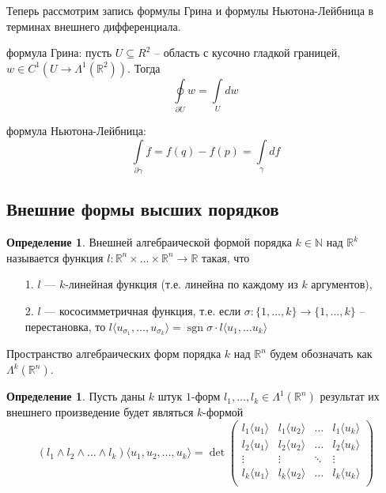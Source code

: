 \documentclass[a5paper]{article}
\newcounter{through}
\theoremstyle{plain}
\theoremstyle{definition}
\newtheorem{definition}[through]{Определение}
\numberwithin{through}{section}
\numberwithin{equation}{section}
\DeclareMathOperator{\sgn}{sgn}
\begin{document}
\medskip

Теперь рассмотрим запись формулы Грина и формулы Ньютона-Лейбница в терминах внешнего дифференциала.

формула Грина:
пусть $U \subseteq{R}^2$ -- область с кусочно гладкой границей, $w \in C^1(U \to \Lambda^1(\mathbb{R}^2)).$ Тогда
\[ \oint\limits_{\partial U} w = \int\limits_U dw \]

формула Ньютона-Лейбница:
\[\int\limits_{\partial \gamma} f = f(q) - f(p) = \int\limits_{\gamma} df \]


\subsection{Внешние формы высших порядков}

\begin{definition}
	Внешней алгебраической формой порядка $k \in \mathbb{N}$ над $\mathbb{R}^k$ называется функция 
	$l : \mathbb{R}^n \times \ldots \times \mathbb{R}^n \to \mathbb{R}$ такая, что 
	\begin{itemize}
		\item[1.]
		$l$ --- $k$-линейная функция (т.е. линейна по каждому из $k$ аргументов),
		
		\item[2.]
		$l$ --- кососимметричная функция, т.е. если $\sigma: \{ 1,\ldots,k \} \to \{ 1,\ldots,k \}$ -- перестановка, то
		$l\langle u_{\sigma_1},\ldots, u_{\sigma_k} \rangle = \sgn \sigma\cdot l\langle u_1, \ldots u_k \rangle$
	\end{itemize}
\end{definition}


	Пространство алгебраических форм порядка $k$ над $\mathbb{R}^n$ будем обозначать как $\Lambda^k(\mathbb{R}^n)$.


\begin{definition}
	Пусть даны $k$ штук $1$-форм $l_1,\ldots,l_k \in \Lambda^1(\mathbb{R}^n)$ результат их внешнего произведение будет являться $k$-формой
	\begin{equation*}
		(l_1 \wedge l_2 \wedge \ldots \wedge l_k)\langle u_1, u_2,\ldots, u_k\rangle = \det 
		\begin{pmatrix}
		l_1\langle u_1 \rangle & l_1 \langle u_2 \rangle & \ldots &  l_1\langle u_k \rangle \\
		l_2\langle u_1 \rangle & l_2 \langle u_2 \rangle & \ldots &  l_2\langle u_k \rangle \\
		\vdots & \vdots & \ddots & \vdots \\ 
		l_k\langle u_1 \rangle & l_k \langle u_2 \rangle & \ldots &  l_k\langle u_k \rangle \\
		\end{pmatrix}
	\end{equation*}
\end{definition}
\end{document}
